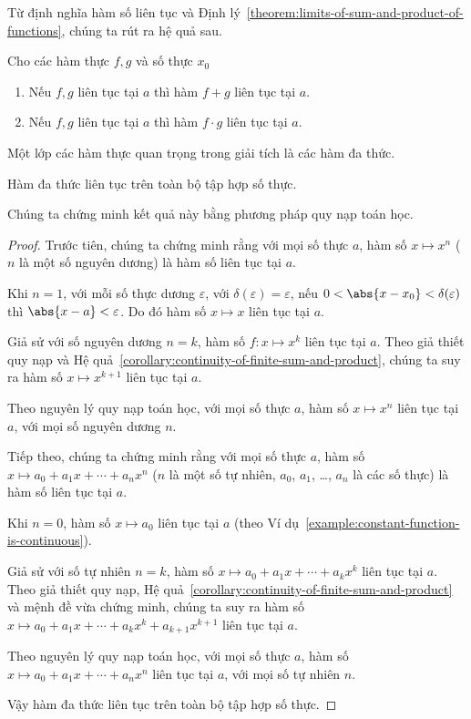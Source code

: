 Từ định nghĩa hàm số liên tục và Định lý~\ref{theorem:limits-of-sum-and-product-of-functions}, chúng ta rút ra hệ quả sau.

\begin{corollary}\label{corollary:continuity-of-finite-sum-and-product}
    Cho các hàm thực $f, g$ và số thực $x_{0}$
    \begin{enumerate}[label={(\roman*)}]
        \item Nếu $f, g$ liên tục tại $a$ thì hàm $f + g$ liên tục tại $a$.
        \item Nếu $f, g$ liên tục tại $a$ thì hàm $f\cdot g$ liên tục tại $a$.
    \end{enumerate}
\end{corollary}

Một lớp các hàm thực quan trọng trong giải tích là các hàm đa thức.
\begin{theorem}
    Hàm đa thức liên tục trên toàn bộ tập hợp số thực.
\end{theorem}

Chúng ta chứng minh kết quả này bằng phương pháp quy nạp toán học.

\begin{proof}
    Trước tiên, chúng ta chứng minh rằng với mọi số thực $a$, hàm số $x\mapsto x^{n}$ ($n$ là một số nguyên dương) là hàm số liên tục tại $a$.

    Khi $n = 1$, với mỗi số thực dương $\varepsilon$, với $\delta(\varepsilon) = \varepsilon$, nếu $0 < \abs{x - x_{0}} < \delta(\varepsilon)$ thì $\abs{x - a} < \varepsilon$. Do đó hàm số $x\mapsto x$ liên tục tại $a$.

    Giả sử với số nguyên dương $n = k$, hàm số $f: x\mapsto x^{k}$ liên tục tại $a$. Theo giả thiết quy nạp và Hệ quả~\ref{corollary:continuity-of-finite-sum-and-product}, chúng ta suy ra hàm số $x\mapsto x^{k+1}$ liên tục tại $a$.

    Theo nguyên lý quy nạp toán học, với mọi số thực $a$, hàm số $x\mapsto x^{n}$ liên tục tại $a$, với mọi số nguyên dương $n$.

    Tiếp theo, chúng ta chứng minh rằng với mọi số thực $a$, hàm số $x\mapsto a_{0} + a_{1}x + \cdots + a_{n}x^{n}$ ($n$ là một số tự nhiên, $a_{0}$, $a_{1}$, \ldots, $a_{n}$ là các số thực) là hàm số liên tục tại $a$.

    Khi $n = 0$, hàm số $x\mapsto a_{0}$ liên tục tại $a$ (theo Ví dụ~\ref{example:constant-function-is-continuous}).

    Giả sử với số tự nhiên $n = k$, hàm số $x\mapsto a_{0} + a_{1}x + \cdots + a_{k}x^{k}$ liên tục tại $a$. Theo giả thiết quy nạp, Hệ quả~\ref{corollary:continuity-of-finite-sum-and-product} và mệnh đề vừa chứng minh, chúng ta suy ra hàm số $x\mapsto a_{0} + a_{1}x + \cdots + a_{k}x^{k} + a_{k+1}x^{k+1}$ liên tục tại $a$.

    Theo nguyên lý quy nạp toán học, với mọi số thực $a$, hàm số $x\mapsto a_{0} + a_{1}x + \cdots + a_{n}x^{n}$ liên tục tại $a$, với mọi số tự nhiên $n$.

    Vậy hàm đa thức liên tục trên toàn bộ tập hợp số thực.
\end{proof}


